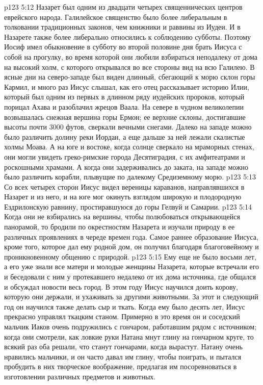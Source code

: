 \vs p123 5:12 \pc Назарет был одним из двадцати четырех священнических центров еврейского народа. Галилейское священство было более либеральным в толковании традиционных законов, чем книжники и раввины из Иудеи. И в Назарете также более либерально относились к соблюдению субботы. Поэтому Иосиф имел обыкновение в субботу во второй половине дня брать Иисуса с собой на прогулку, во время которой они любили взбираться неподалеку от дома на высокий холм, с которого открывался во все стороны вид на всю Галилею. В ясные дни на северо\hyp{}западе был виден длинный, сбегающий к морю склон горы Кармил, и много раз Иисус слышал, как его отец рассказывает историю Илии, который был одним из первых в длинном ряду иудейских пророков, который порицал Ахава и разоблачил жрецов Ваала. На севере в чудном великолепии возвышалась снежная вершина горы Ермон; ее верхние склоны, достигавшие высоты почти 3000 футов, сверкали вечными снегами. Далеко на западе можно было различить долину реки Иордан, а еще дальше за ней лежали скалистые холмы Моава. А на юге и востоке, когда солнце сверкало на мраморных стенах, они могли увидеть греко\hyp{}римские города Десятиградия, с их амфитеатрами и роскошными храмами. А когда они задерживались до заката, на западе можно было различить корабли, плывущие по далекому Средиземному морю.
\vs p123 5:13 Со всех четырех сторон Иисус видел вереницы караванов, направлявшихся в Назарет и из него, и на юге мог окинуть взглядом широкую и плодородную Ездрилонскую равнину, простиравшуюся до горы Гелвуй и Самарии.
\vs p123 5:14 Когда они не взбирались на вершины, чтобы полюбоваться открывающейся панорамой, то бродили по окрестностям Назарета и изучали природу в ее различных проявлениях в череде времен года. Самое раннее образование Иисуса, кроме того, которое дал ему родной дом, он получил благодаря благоговейному и проникновенному общению с природой.
\vs p123 5:15 \pc Ему еще не было восьми лет, а его уже знали все матери и молодые женщины Назарета, которые встречали его и беседовали с ним у протекавшего недалеко от их дома источника, где общался и обсуждал новости весь город. В этом году Иисус научился доить корову, которую они держали, и ухаживать за другими животными. За этот и следующий год он научился также делать сыр и ткать. Когда ему было десять лет, Иисус прекрасно управлял ткацким станом. Примерно в это время он и соседский мальчик Иаков очень подружились с гончаром, работавшим рядом с источником; когда они смотрели, как ловкие руки Натана мнут глину на гончарном круге, то всякий раз оба решали, что станут гончарами, когда вырастут. Натану очень нравились мальчики, и он часто давал им глину, чтобы поиграть, и пытался пробудить в них творческое воображение, предлагая им посоревноваться в изготовлении различных предметов и животных.
